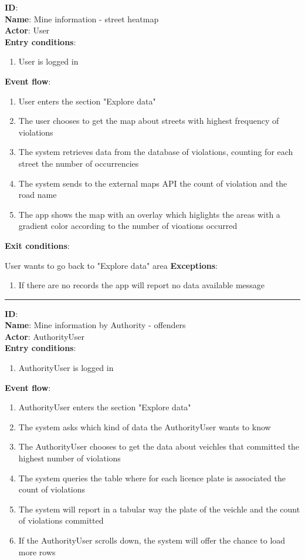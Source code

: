   
  
	\textbf{ID}:  \\
	\textbf{Name}: Mine information - street heatmap \\
	\textbf{Actor}: User  \\
	\textbf{Entry conditions}:
	\begin{enumerate}
		\item{User is logged in}
	\end{enumerate}
	\textbf{Event flow}:
	\begin{enumerate}
		\item{User enters the section "Explore data"}
    \item{The user chooses to get the map about streets with highest frequency of violations}
    \item{The system retrieves data from the database of violations, counting for each street the number of occurrencies}
    \item{The system sends to the external maps API the count of violation and the road name}
    \item{The app shows the map with an overlay which higlights the areas with a gradient color according to the number of vioations occurred}
	\end{enumerate}
	\textbf{Exit conditions}:
        \item{User wants to go back to "Explore data" area}
	\textbf{Exceptions}:
  \begin{enumerate}
    \item{If there are no records the app will report no data available message}
  \end{enumerate}
	\rule{\linewidth}{0.4pt}
	\textbf{ID}:  \\
	\textbf{Name}: Mine information by Authority - offenders \\
	\textbf{Actor}: AuthorityUser   \\
	\textbf{Entry conditions}:
	\begin{enumerate}
		\item{AuthorityUser is logged in}
	\end{enumerate}
	\textbf{Event flow}:
	\begin{enumerate}
		\item{AuthorityUser enters the section "Explore data"}
		\item{The system asks which kind of data the AuthorityUser wants to know}
    \item{The AuthorityUser chooses to get the data about veichles that committed the highest number of violations}
    \item{The system queries the table where for each licence plate is associated the count of violations }
    \item{The system will report in a tabular way the plate of the veichle and the count of violations committed}
    \item{If the AuthorityUser scrolls down, the system will offer the chance to load more rows}
	\end{enumerate}
